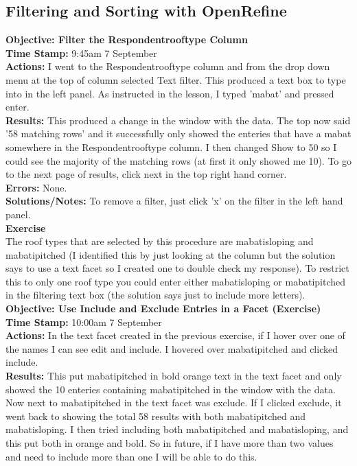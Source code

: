 \documentclass{article}
\begin{document}
\begin{FlushLeft}
\subsection{Filtering and Sorting with OpenRefine}
\textbf{Objective: Filter the Respondent\textunderscore roof\textunderscore type Column}\\ 
\textbf{Time Stamp:} 9:45am 7 September\\
\textbf{Actions:} I went to the Respondent\textunderscore roof\textunderscore type column and from the drop down menu at the top of column selected Text filter. This produced a text box to type into in the left panel. As instructed in the lesson, I typed 'mabat' and pressed enter.\\
\textbf{Results:} This produced a change in the window with the data. The top now said '58 matching rows' and it successfully only showed the enteries that have a mabat somewhere in the  Respondent\textunderscore roof\textunderscore type column. I then changed Show to 50 so I could see the majority of the matching rows (at first it only showed me 10). To go to the next page of results, click next in the top right hand corner. \\
\textbf{Errors:} None.\\
\textbf{Solutions/Notes:} To remove a filter, just click 'x' on the filter in the left hand panel.\\
\vspace{5mm}
\textbf{Exercise}\\ 
The roof types that are selected by this procedure are mabatisloping and mabatipitched (I identified this by just looking at the column but the solution says to use a text facet so I created one to double check my response). To restrict this to only one roof type you could enter either mabatisloping or mabatipitched in the filtering text box (the solution says just to include more letters).\\
\vspace{5mm}
\textbf{Objective: Use Include and Exclude Entries in a Facet (Exercise)}\\ 
\textbf{Time Stamp:} 10:00am 7 September\\
\textbf{Actions:} In the text facet created in the previous exercise, if I hover over one of the names I can see edit and include. I hovered over mabatipitched and clicked include.\\
\textbf{Results:} This put mabatipitched in bold orange text in the text facet and only showed the 10 enteries containing mabatipitched in the window with the data. Now next to mabatipitched in the text facet was exclude. If I clicked exclude, it went back to showing the total 58 results with both mabatipitched and mabatisloping. I then tried including both mabatipitched and mabatisloping, and this put both in orange and bold. So in future, if I have more than two values and need to include more than one I will be able to do this. \\

\end{FlushLeft}
\end{document}
